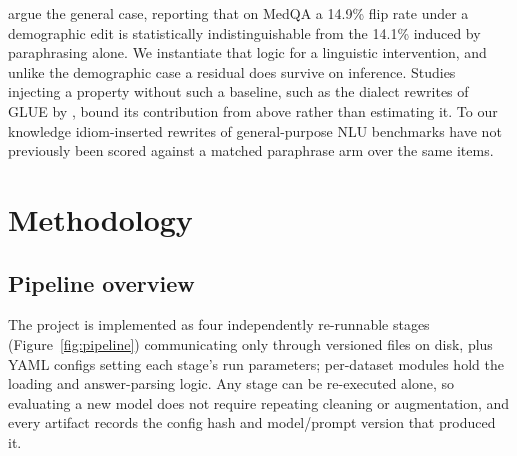 \documentclass{article}   %
\newcommand{\citetf}[1]{\citet{#1}}
\begin{document}
\citetf{yang2026compared} argue the general case, reporting that on MedQA a
14.9\% flip rate under a demographic edit is statistically indistinguishable
from the 14.1\% induced by paraphrasing alone. We instantiate that logic for a
linguistic intervention, and unlike the demographic case a residual does
survive on inference. Studies injecting a property without such a baseline,
such as the dialect rewrites of GLUE by \citetf{ziems2022value}, bound its
contribution from above rather than estimating it. To our knowledge
idiom-inserted rewrites of general-purpose NLU benchmarks have not previously
been scored against a matched paraphrase arm over the same items.

\section{Methodology}
\label{sec:methodology}

\subsection{Pipeline overview}

The project is implemented as four independently re-runnable stages
(Figure~\ref{fig:pipeline}) communicating only through versioned files on disk,
plus YAML configs setting each stage's run parameters; per-dataset modules hold
the loading and answer-parsing logic. Any stage can be re-executed alone, so
evaluating a new model does not require repeating cleaning or augmentation, and
every artifact records the config
hash and model/prompt version that produced it.
\end{document}
